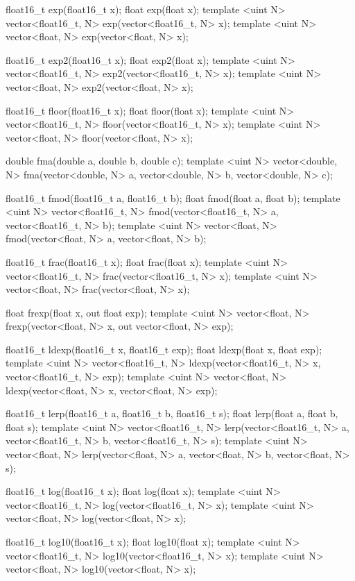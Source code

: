 \begin{HLSL}
float16_t exp(float16_t x);
float exp(float x);
template <uint N> vector<float16_t, N> exp(vector<float16_t, N> x);
template <uint N> vector<float, N> exp(vector<float, N> x);

float16_t exp2(float16_t x);
float exp2(float x);
template <uint N> vector<float16_t, N> exp2(vector<float16_t, N> x);
template <uint N> vector<float, N> exp2(vector<float, N> x);

float16_t floor(float16_t x);
float floor(float x);
template <uint N> vector<float16_t, N> floor(vector<float16_t, N> x);
template <uint N> vector<float, N> floor(vector<float, N> x);

double fma(double a, double b, double c);
template <uint N>
vector<double, N> fma(vector<double, N> a, vector<double, N> b,
                      vector<double, N> c);

float16_t fmod(float16_t a, float16_t b);
float fmod(float a, float b);
template <uint N>
vector<float16_t, N> fmod(vector<float16_t, N> a, vector<float16_t, N> b);
template <uint N> vector<float, N> fmod(vector<float, N> a, vector<float, N> b);

float16_t frac(float16_t x);
float frac(float x);
template <uint N> vector<float16_t, N> frac(vector<float16_t, N> x);
template <uint N> vector<float, N> frac(vector<float, N> x);

float frexp(float x, out float exp);
template <uint N>
vector<float, N> frexp(vector<float, N> x, out vector<float, N> exp);

float16_t ldexp(float16_t x, float16_t exp);
float ldexp(float x, float exp);
template <uint N>
vector<float16_t, N> ldexp(vector<float16_t, N> x, vector<float16_t, N> exp);
template <uint N>
vector<float, N> ldexp(vector<float, N> x, vector<float, N> exp);

float16_t lerp(float16_t a, float16_t b, float16_t s);
float lerp(float a, float b, float s);
template <uint N>
vector<float16_t, N> lerp(vector<float16_t, N> a, vector<float16_t, N> b,
                          vector<float16_t, N> s);
template <uint N>
vector<float, N> lerp(vector<float, N> a, vector<float, N> b,
                      vector<float, N> s);

float16_t log(float16_t x);
float log(float x);
template <uint N> vector<float16_t, N> log(vector<float16_t, N> x);
template <uint N> vector<float, N> log(vector<float, N> x);

float16_t log10(float16_t x);
float log10(float x);
template <uint N> vector<float16_t, N> log10(vector<float16_t, N> x);
template <uint N> vector<float, N> log10(vector<float, N> x);


\end{HLSL}
